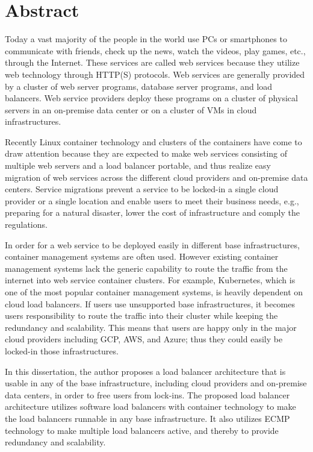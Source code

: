 \chapter*{Abstract}

Today a vast majority of the people in the world use PCs or smartphones to communicate with friends, check up the news, watch the videos, play games, etc., through the Internet.
These services are called web services because they utilize web technology through HTTP(S) protocols.
Web services are generally provided by a cluster of web server programs, database server programs, and load balancers.
Web service providers deploy these programs on a cluster of physical servers in an on-premise data center or on a cluster of VMs in cloud infrastructures.

Recently Linux container technology and clusters of the containers have come to draw attention because they are expected to make web services consisting of multiple web servers and a load balancer portable, and thus realize easy migration of web services across the different cloud providers and on-premise data centers.
Service migrations prevent a service to be locked-in a single cloud provider or a single location and enable users to meet their business needs, e.g., preparing for a natural disaster, lower the cost of infrastructure and comply the regulations.

In order for a web service to be deployed easily in different base infrastructures, container management systems are often used.
However existing container management systems lack the generic capability to route the traffic from the internet into web service container clusters.
For example, Kubernetes, which is one of the most popular container management systems, is heavily dependent on cloud load balancers.
If users use unsupported base infrastructures, it becomes users responsibility to route the traffic into their cluster while keeping the redundancy and scalability.
This means that users are happy only in the major cloud providers including GCP, AWS, and Azure; thus they could easily be locked-in those infrastructures.

In this dissertation, the author proposes a load balancer architecture that is usable in any of the base infrastructure, including cloud providers and on-premise data centers, in order to free users from lock-ins.
The proposed load balancer architecture utilizes software load balancers with container technology to make the load balancers runnable in any base infrastructure.
It also utilizes ECMP technology to make multiple load balancers active, and thereby to provide redundancy and scalability.

